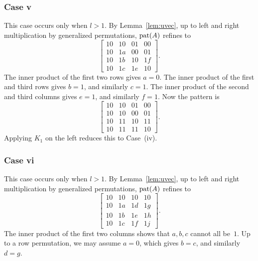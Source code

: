 \documentclass[reprint,amsmath,amssymb,aps,pra]{revtex4-2}
\begin{document}
\subsubsection{Case v}
This case occurs only when $l>1$. By Lemma~\ref{lem:uvec}, up to left
and right multiplication by generalized permutations, $\operatorname{pat}(A)$
refines to
\[
  \begin{bmatrix}
    10 & 10 & 01 & 00 \\
    10 & 1a & 00 & 01 \\
    10 & 1b & 10 & 1f \\
    10 & 1c & 1e & 10
  \end{bmatrix}.
\]
The inner product of the first two rows gives $a =0$. The inner
product of the first and third rows gives $b = 1$, and similarly
$c = 1$. The inner product of the second and third columns gives
$e = 1$, and similarly $f=1$. Now the pattern is
\[
  \begin{bmatrix}
    10 & 10 & 01 & 00 \\
    10 & 10 & 00 & 01 \\
    10 & 11 & 10 & 11 \\
    10 & 11 & 11 & 10
  \end{bmatrix}.
\]
Applying $K_1$ on the left reduces this to Case~(iv).

\subsubsection{Case vi}
\label{sec:casevi}
This case occurs only when $l>1$. By Lemma~\ref{lem:uvec}, up to left
and right multiplication by generalized permutations, $\operatorname{pat}(A)$
refines to
\[
  \begin{bmatrix}
    10 & 10 & 10 & 10 \\
    10 & 1a & 1d & 1g \\
    10 & 1b & 1e & 1h \\
    10 & 1c & 1f & 1j
  \end{bmatrix}.
\]
The inner product of the first two columns shows that $a,b,c$ cannot
all be~$1$. Up to a row permutation, we may assume $a=0$, which gives
$b = c$, and similarly $d = g$.
\end{document}
